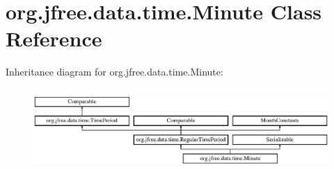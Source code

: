 \hypertarget{classorg_1_1jfree_1_1data_1_1time_1_1_minute}{}\section{org.\+jfree.\+data.\+time.\+Minute Class Reference}
\label{classorg_1_1jfree_1_1data_1_1time_1_1_minute}
Inheritance diagram for org.\+jfree.\+data.\+time.\+Minute\+:\begin{figure}[H]
\begin{center}
\leavevmode
\includegraphics[height=3.190883cm]{classorg_1_1jfree_1_1data_1_1time_1_1_minute}
\end{center}
\end{figure}
